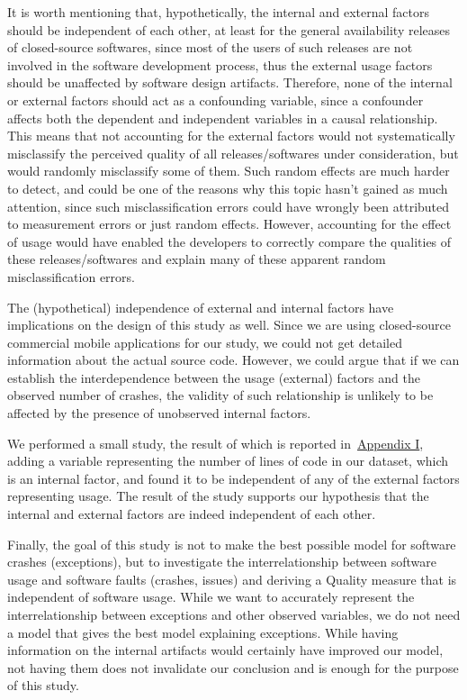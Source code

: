 \documentclass[smallcondensed]{svjour3}     %
\begin{document}
It is worth mentioning that, hypothetically, the internal and external factors should be independent of each other, at least for the general availability releases of closed-source softwares, since most of the users of such releases are not involved in the software development process, thus the external usage factors should be unaffected by software design artifacts. Therefore, none of the internal or external factors should act as a confounding variable, since a confounder affects both the dependent and independent variables in a causal relationship. This means that not accounting for the external factors would not systematically misclassify the perceived quality of all releases/softwares under consideration, but would randomly misclassify some of them. Such random effects are much harder to detect, and could be one of the reasons why this topic hasn't gained as much attention, since such misclassification errors could have wrongly been attributed to measurement errors or just random effects. However, accounting for the effect of usage would have enabled the developers to correctly compare the qualities of these releases/softwares and explain many of these apparent random misclassification errors.

The (hypothetical) independence of external and internal factors have implications on the design of this study as well. Since we are using closed-source commercial mobile applications for our study, we could not get detailed information about the actual source code. However, we could argue that if we can establish the interdependence between the usage (external) factors and the observed number of crashes, the validity of such relationship is unlikely to be affected by the presence of unobserved internal factors.

We performed a small study, the result of which is reported in~\hyperref[app1]{Appendix I},  adding a variable representing the number of lines of code in our dataset, which is an internal factor, and found it to be independent of any of the external factors representing usage. The result of the study supports our hypothesis that the internal and external factors are indeed independent of each other. 

Finally, the goal of this study is not to make the best possible model for software crashes (exceptions), but to investigate the interrelationship between software usage and software faults (crashes, issues) and deriving a Quality measure that is independent of software usage. While we want to accurately represent the interrelationship between exceptions and other observed variables, we do not need a model that gives the best model explaining exceptions. While having information on the internal artifacts would certainly have improved our model, not having them does not invalidate our conclusion and is enough for the purpose of this study.
\end{document}
